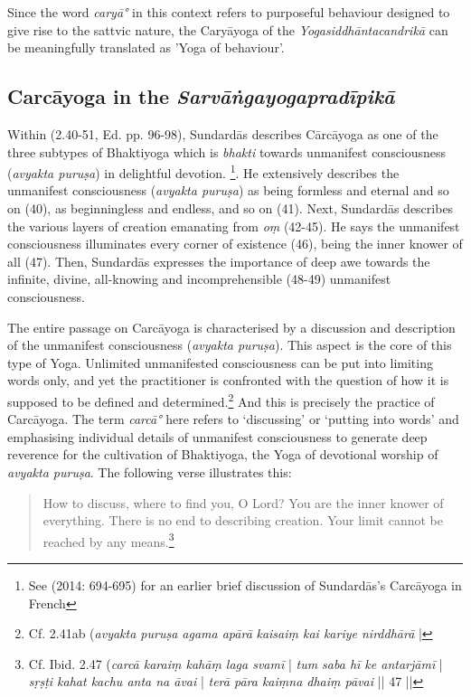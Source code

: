  Since the word \textit{caryā°} in this context refers to purposeful behaviour designed to give rise to the sattvic nature, the Caryāyoga of the \textit{Yogasiddhāntacandrikā} can be meaningfully translated as 'Yoga of behaviour'.  

\subsection{Carcāyoga in the \textit{Sarvāṅgayogapradīpikā}}

Within  (2.40-51, Ed. pp. 96-98), Sundardās describes Cārcāyoga as one of the three subtypes of Bhaktiyoga which is \textit{bhakti} towards unmanifest consciousness (\textit{avyakta puruṣa}) in delightful devotion. \footnote{See \citeauthor{burger2014sarvangayogapradipika} (2014: 694-695) for an earlier brief discussion of Sundardās's Carcāyoga in French}. He extensively describes the unmanifest consciousness (\textit{avyakta puruṣa}) as being formless and eternal and so on (40), as beginningless and endless, and so on (41). Next, Sundardās describes the various layers of creation emanating from \textit{oṃ} (42-45). He says the unmanifest consciousness illuminates every corner of existence (46), being the inner knower of all (47). Then, Sundardās expresses the importance of deep awe towards the infinite, divine, all-knowing and incomprehensible (48-49) unmanifest consciousness.

The entire passage on Carcāyoga is characterised by a discussion and description of the unmanifest consciousness (\textit{avyakta puruṣa}). This aspect is the core of this type of Yoga. Unlimited unmanifested consciousness can be put into limiting words only, and yet the practitioner is confronted with the question of how it is supposed to be defined and determined.\footnote{Cf.  2.41ab (\textit{avyakta puruṣa agama apārā} \textit{kaisaiṃ kai kariye nirddhārā} |} And this is precisely the practice of Carcāyoga. The term \textit{carcā°} here refers to `discussing' or `putting into words' and emphasising individual details of unmanifest consciousness to generate deep reverence for the cultivation of Bhaktiyoga, the Yoga of devotional worship of \textit{avyakta puruṣa}. The following verse illustrates this:
\begin{quote}
How to discuss, where to find you, O Lord? You are the inner knower of everything. There is no end to describing creation. Your limit cannot be reached by any means.\footnote{Cf. Ibid. 2.47 (\textit{carcā karaiṃ kahāṃ laga svamī} | \textit{tum saba hī ke antarjāmī} | \textit{sṛṣṭi kahat kachu anta na āvai} | \textit{terā pāra kaiṃna dhaiṃ pāvai} || 47 ||} \end{quote}

